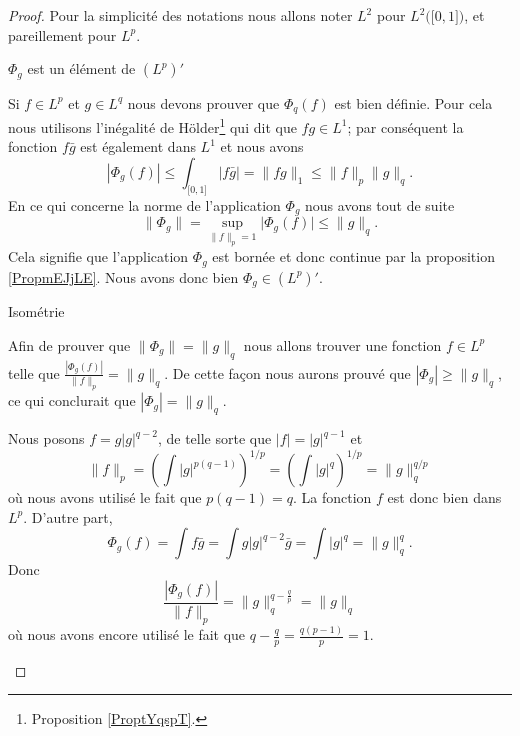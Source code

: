 \begin{proof}
    Pour la simplicité des notations nous allons noter \( L^2\) pour \( L^2\big( \mathopen[ 0 , 1 \mathclose] \big)\), et pareillement pour \( L^p\).
    \begin{subproof}
        \item[\( \Phi_g\) est un élément de \( (L^p)'\)]

            Si \( f\in L^p\) et \( g\in L^q\) nous devons prouver que \( \Phi_q(f)\) est bien définie. Pour cela nous utilisons l'inégalité de Hölder\footnote{Proposition \ref{ProptYqspT}.} qui dit que \( fg\in L^1\); par conséquent la fonction \( f\bar g\) est également dans \( L^1\) et nous avons
            \begin{equation}
                | \Phi_g(f) |\leq\int_{\mathopen[ 0 , 1 \mathclose]}| f\bar g |=\| fg \|_1\leq \| f \|_p\| g \|_q.
            \end{equation}
            En ce qui concerne la norme de l'application \( \Phi_g\) nous avons tout de suite
            \begin{equation}
                \| \Phi_g \|=\sup_{\| f\|_p=1}\big| \Phi_g(f) \big|\leq \| g \|_q.
            \end{equation}
            Cela signifie que l'application \( \Phi_g\) est bornée et donc continue par la proposition \ref{PropmEJjLE}. Nous avons donc bien \( \Phi_g\in (L^p)'\).

        \item[Isométrie]

            Afin de prouver que \( \| \Phi_g \|=\| g \|_q\) nous allons trouver une fonction \( f\in L^p\) telle que \( \frac{ | \Phi_g(f) | }{ \| f \|_p }=\| g \|_q\).  De cette façon nous aurons prouvé que \( | \Phi_g |\geq \| g \|_q\), ce qui conclurait que \( | \Phi_g |=\| g \|_q\).

            Nous posons \( f=g| g |^{q-2}\), de telle sorte que \( | f |=| g |^{q-1}\) et
            \begin{equation}
                \| f \|_p=\left( \int| g |^{p(q-1)} \right)^{1/p}=\left( \int | g |^q \right)^{1/p}=\| g \|_q^{q/p}
            \end{equation}
            où nous avons utilisé le fait que \( p(q-1)=q\). La fonction \( f\) est donc bien dans \( L^p\). D'autre part,
            \begin{equation}
                \Phi_g(f)=\int f\bar g=\int g| g |^{q-2}\bar g=\int | g |^q=\| g \|_q^q.
            \end{equation}
            Donc
            \begin{equation}
                \frac{ | \Phi_g(f) | }{ \| f \|_p }=\| g \|_q^{q-\frac{ q }{ p }}=\| g \|_q
            \end{equation}
            où nous avons encore utilisé le fait que \( q-\frac{ q }{ p }=\frac{ q(p-1) }{ p }=1\).


\end{subproof}
\end{proof}

